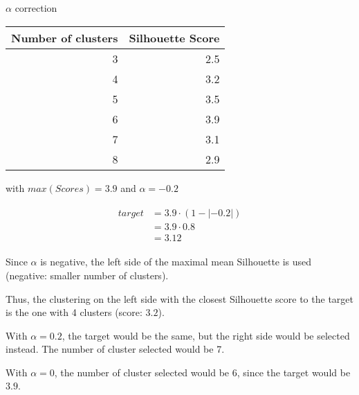 \begin{example}[!t]
  \centering
  \caption{$\alpha$ correction}
  \label{ex:alpha_correction}

  \begin{tabular}{r r}
    \toprule
    Number of clusters & Silhouette Score \\
    \midrule
    3 & 2.5 \\
    4 & 3.2 \\
    5 & 3.5 \\
    6 & 3.9 \\
    7 & 3.1 \\
    8 & 2.9 \\
    \bottomrule
  \end{tabular}

  \vspace{0.5cm}

  \raggedright
  with $max(Scores) = 3.9$ and $\alpha = -0.2$

  \begin{gather*}
    \begin{aligned}
    target &= 3.9 \cdot (1 - |-0.2|) \\
           &= 3.9 \cdot 0.8 \\
           &= 3.12
     \end{aligned}
   \end{gather*}

  \vspace{0.5cm}

  Since $\alpha$ is negative, the left side of the maximal mean Silhouette is used (negative: smaller number of clusters).

  Thus, the clustering on the left side with the closest Silhouette score to the target is the one with 4 clusters (score: $3.2$).

  With $\alpha = 0.2$, the target would be the same, but the right side would be selected instead.
  The number of cluster selected would be 7.

  With $\alpha = 0$, the number of cluster selected would be 6, since the target would be $3.9$.
\end{example}

